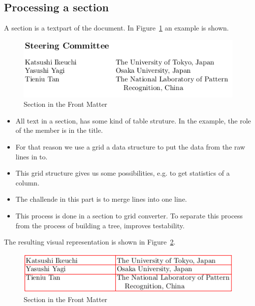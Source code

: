 \documentclass{ou-report}
\begin{document}
\subsection{Processing a section}
A section is a textpart of the document. In 
Figure~\ref{fig:front_matter_section} an example is shown.
\begin{figure}[H]
    \centering
    \includegraphics[width=12cm]{images/front_matter/section.png}
    \caption{Section in the Front Matter}
    \label{fig:front_matter_section}
\end{figure}
\begin{itemize}
    \item All text in a section, has some kind of table 
        struture. In the example, the role of the member is in the title.
    \item For that reason we use a grid a data structure to put the data from 
        the raw lines in to.
    \item This grid structure gives us some possibilities, e.g. to get 
        statistics of a column.
    \item The challende in this part is to merge lines into one line.
    \item This process is done in a section to grid converter. To separate this
        process from the process of building a tree, improves testability.
\end{itemize}
The resulting visual representation is shown in 
Figure~\ref{fig:front_matter_section_grid}.
\begin{figure}[H]
    \centering
    \includegraphics[width=12cm]{images/front_matter/section_table.png}
    \caption{Section in the Front Matter}
    \label{fig:front_matter_section_grid}
\end{figure}
\end{document}
